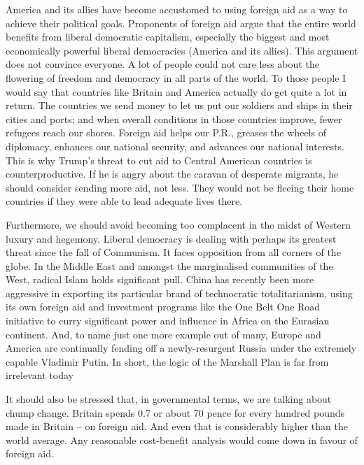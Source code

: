    America and its allies have become accustomed to using foreign aid as a
   way to achieve their political goals. Proponents of foreign aid argue
   that the entire world benefits from liberal democratic capitalism,
   especially the biggest and most economically powerful liberal
   democracies (America and its allies). This argument does not convince
   everyone. A lot of people could not care less about the flowering of
   freedom and democracy in all parts of the world. To those people I
   would say that countries like Britain and America actually do get quite
   a lot in return. The countries we send money to let us put our soldiers
   and ships in their cities and ports; and when overall conditions in
   those countries improve, fewer refugees reach our shores. Foreign aid
   helps our P.R., greases the wheels of diplomacy, enhances our national
   security, and advances our national interests. This is why Trump's
   threat to cut aid to Central American countries is counterproductive.
   If he is angry about the caravan of desperate migrants, he should
   consider sending more aid, not less. They would not be fleeing their
   home countries if they were able to lead adequate lives there.

   Furthermore, we should avoid becoming too complacent in the midst of
   Western luxury and hegemony. Liberal democracy is dealing with perhaps
   its greatest threat since the fall of Communism. It faces opposition
   from all corners of the globe. In the Middle East and amongst the
   marginalised communities of the West, radical Islam holds significant
   pull. China has recently been more aggressive in exporting its
   particular brand of technocratic totalitarianism, using its own foreign
   aid and investment programs like the One Belt One Road initiative to
   curry significant power and influence in Africa on the Eurasian
   continent. And, to name just one more example out of many, Europe and
   America are continually fending off a newly-resurgent Russia under the
   extremely capable Vladimir Putin. In short, the logic of the Marshall
   Plan is far from irrelevant today

   It should also be stressed that, in governmental terms, we are talking
   about chump change. Britain spends 0.7%
   or about 70 pence for every hundred pounds made in Britain -- on
   foreign aid. And even that is considerably higher than the world
   average. Any reasonable cost-benefit analysis would come down in favour
   of foreign aid.


